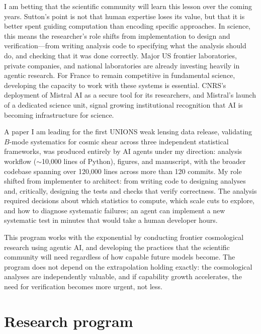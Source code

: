\documentclass[11pt, a4paper]{article}
\begin{document}
I am betting that the scientific community will learn this lesson over the coming years.
Sutton's point is not that human expertise loses its value, but that it is better spent guiding computation than encoding specific approaches.
In science, this means the researcher's role shifts from implementation to design and verification---from writing analysis code to specifying what the analysis should do, and checking that it was done correctly.
Major US frontier laboratories, private companies, and national laboratories are already investing heavily in agentic research.
For France to remain competitive in fundamental science, developing the capacity to work with these systems is essential.
CNRS's deployment of Mistral AI as a secure tool for its researchers, and Mistral's launch of a dedicated science unit, signal growing institutional recognition that AI is becoming infrastructure for science.

A paper I am leading for the first UNIONS weak lensing data release, validating $B$-mode systematics for cosmic shear across three independent statistical frameworks, was produced entirely by AI agents under my direction: analysis workflow ($\sim$10,000 lines of Python), figures, and manuscript, with the broader codebase spanning over 120,000 lines across more than 120 commits.
My role shifted from implementer to architect: from writing code to designing analyses and, critically, designing the tests and checks that verify correctness.
The analysis required decisions about which statistics to compute, which scale cuts to explore, and how to diagnose systematic failures; an agent can implement a new systematic test in minutes that would take a human developer hours.

This program works with the exponential by conducting frontier cosmological research using agentic AI, and developing the practices that the scientific community will need regardless of how capable future models become.
The program does not depend on the extrapolation holding exactly: the cosmological analyses are independently valuable, and if capability growth accelerates, the need for verification becomes more urgent, not less.

\section{Research program}
\end{document}
